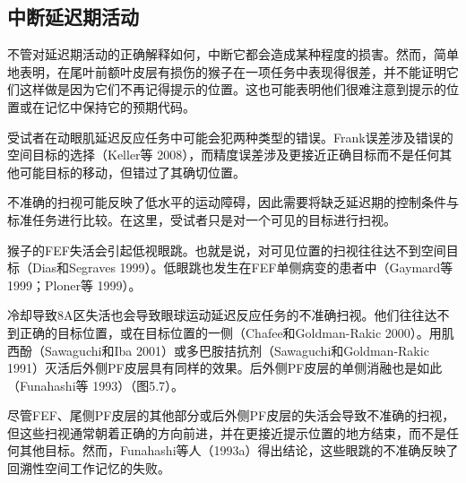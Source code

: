\subsection{中断延迟期活动}
不管对延迟期活动的正确解释如何，中断它都会造成某种程度的损害。然而，简单地表明，在尾叶前额叶皮层有损伤的猴子在一项任务中表现得很差，并不能证明它们这样做是因为它们不再记得提示的位置。这也可能表明他们很难注意到提示的位置或在记忆中保持它的预期代码。

受试者在动眼肌延迟反应任务中可能会犯两种类型的错误。Frank误差涉及错误的空间目标的选择（Keller等 2008），而精度误差涉及更接近正确目标而不是任何其他可能目标的移动，但错过了其确切位置。

不准确的扫视可能反映了低水平的运动障碍，因此需要将缺乏延迟期的控制条件与标准任务进行比较。在这里，受试者只是对一个可见的目标进行扫视。

猴子的FEF失活会引起低视眼跳。也就是说，对可见位置的扫视往往达不到空间目标（Dias和Segraves 1999）。低眼跳也发生在FEF单侧病变的患者中（Gaymard等 1999；Ploner等 1999）。

冷却导致8A区失活也会导致眼球运动延迟反应任务的不准确扫视。他们往往达不到正确的目标位置，或在目标位置的一侧（Chafee和Goldman-Rakic 2000）。用肌西酚（Sawaguchi和Iba 2001）或多巴胺拮抗剂（Sawaguchi和Goldman-Rakic 1991）灭活后外侧PF皮层具有同样的效果。后外侧PF皮层的单侧消融也是如此（Funahashi等 1993）（图5.7）。

尽管FEF、尾侧PF皮层的其他部分或后外侧PF皮层的失活会导致不准确的扫视，但这些扫视通常朝着正确的方向前进，并在更接近提示位置的地方结束，而不是任何其他目标。然而，Funahashi等人（1993a）得出结论，这些眼跳的不准确反映了回溯性空间工作记忆的失败。

